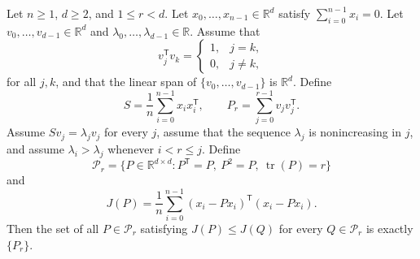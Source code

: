 \begin{theorem}
Let $n\geq1$, $d\geq2$, and $1\leq r<d$.  Let
$x_0,\ldots,x_{n-1}\in\mathbb R^d$ satisfy
$\sum_{i=0}^{n-1}x_i=0$.  Let $v_0,\ldots,v_{d-1}\in\mathbb R^d$ and
$\lambda_0,\ldots,\lambda_{d-1}\in\mathbb R$.  Assume that
\[
  v_j^{\mathsf T}v_k=
  \begin{cases}1,&j=k,\\0,&j\ne k,\end{cases}
\]
for all $j,k$, and that the linear span of $\{v_0,\ldots,v_{d-1}\}$ is
$\mathbb R^d$.  Define
\[
  S=\frac1n\sum_{i=0}^{n-1}x_i x_i^{\mathsf T},
  \qquad
  P_r=\sum_{j=0}^{r-1}v_jv_j^{\mathsf T}.
\]
Assume $Sv_j=\lambda_jv_j$ for every $j$, assume that the sequence
$\lambda_j$ is nonincreasing in $j$, and assume
$\lambda_i>\lambda_j$ whenever $i<r\leq j$.  Define
\[
  \mathcal P_r=\{P\in\mathbb R^{d\times d}:
    P^{\mathsf T}=P,\ P^2=P,\ \operatorname{tr}(P)=r\}
\]
and
\[
  J(P)=\frac1n\sum_{i=0}^{n-1}
    (x_i-Px_i)^{\mathsf T}(x_i-Px_i).
\]
Then the set of all $P\in\mathcal P_r$ satisfying
$J(P)\leq J(Q)$ for every $Q\in\mathcal P_r$ is exactly $\{P_r\}$.
\end{theorem}
